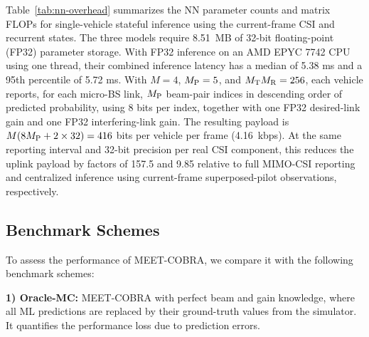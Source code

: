 \documentclass[conference, a4paper]{IEEEtran}
\newcommand{\rev}[1]{\textcolor{revisioncolor}{{}#1}}
\theoremstyle{remark}
\begin{document}
\rev{Table~\ref{tab:nn-overhead} summarizes the NN parameter counts and matrix FLOPs for single-vehicle stateful inference using the current-frame CSI and recurrent states. The three models require 8.51~MB of 32-bit floating-point (FP32) parameter storage. With FP32 inference on an AMD EPYC 
7742 CPU using one thread, their combined inference latency has a median of \rev{5.38} ms and a 95th percentile of \rev{5.72} ms. With $M=4$, $M_{\rm P}=5$, and $M_{\rm T}M_{\rm R}=256$, each vehicle reports, for each micro-BS link, $M_{\rm P}$ beam-pair indices in descending order of predicted probability, using 8 bits per index, together with one FP32 desired-link gain and one FP32 interfering-link gain. The resulting payload is $M(8M_{\rm P}+2\times32)=416$ bits per vehicle per frame (4.16~kbps). At the same reporting interval and 32-bit precision per real CSI component, this reduces the uplink payload by factors of 157.5 and 9.85 relative to full MIMO-CSI reporting and centralized inference using current-frame superposed-pilot observations, respectively.}



\subsection{Benchmark Schemes}
\label{subsec:benchmarks}

To assess the performance of MEET-COBRA, we compare it with the following benchmark schemes:


\textbf{1) Oracle-MC:} MEET-COBRA with perfect beam and gain knowledge, where all ML predictions are replaced by their ground-truth values from the simulator. It quantifies the performance loss due to prediction errors.
\end{document}
